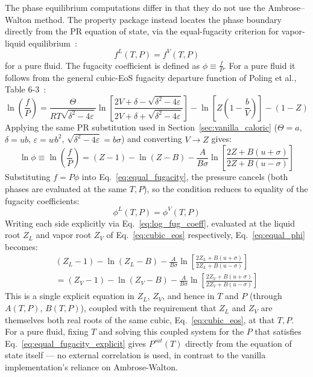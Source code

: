 \documentclass{article}
\begin{document}
The phase equilibrium computations differ in that they do not use the
Ambrose--Walton method. The property
package instead locates the phase boundary directly from the PR equation of state, via the equal-fugacity criterion for vapor-liquid
equilibrium~\cite[sec.\ 8-2]{poling2001}:
\begin{equation}\label{eq:equal_fugacity}
    f^{L}(T,P) = f^{V}(T,P)
\end{equation}
for a pure fluid. The fugacity coefficient is defined as $\phi\equiv \frac{f}{P}$. For a pure fluid it follows from the general cubic-EoS fugacity departure function of Poling et al., Table 6-3~\cite{poling2001}:
\begin{equation}
    \ln\left(\frac{f}{P}\right) = \frac{\Theta}{RT\sqrt{\delta^2-4\varepsilon}}\ln\left[\frac{2V+\delta-\sqrt{\delta^2-4\varepsilon}}{2V+\delta+\sqrt{\delta^2-4\varepsilon}}\right] - \ln\left[Z\left(1-\frac{b}{V}\right)\right] - (1-Z)
\end{equation}
Applying the same PR substitution used in Section~\ref{sec:vanilla_caloric} ($\Theta=a$,
$\delta=ub$, $\varepsilon=wb^2$, $\sqrt{\delta^2-4\varepsilon}=b\sigma$)
and converting $V\to Z$ gives:
\begin{equation}\label{eq:log_fug_coeff}
    \ln\phi \equiv \ln\left(\frac{f}{P}\right) = (Z-1) - \ln(Z-B) - \frac{A}{B\sigma}\ln\left[\frac{2Z+B(u+\sigma)}{2Z+B(u-\sigma)}\right]
\end{equation}
Substituting $f=P\phi$ into
Eq.~\eqref{eq:equal_fugacity}, the pressure cancels (both phases are
evaluated at the same $T,P$), so the condition reduces to equality of
the fugacity coefficients:
\begin{equation}\label{eq:equal_phi}
    \phi^{L}(T,P) = \phi^{V}(T,P)
\end{equation}
Writing each side explicitly via Eq.~\eqref{eq:log_fug_coeff}, evaluated
at the liquid root $Z_L$ and vapor root $Z_V$ of Eq.~\eqref{eq:cubic_eos}
respectively, Eq.~\eqref{eq:equal_phi} becomes:
\begin{equation}\label{eq:equal_fugacity_explicit}
\begin{aligned}
    (Z_L-1) - \ln(Z_L-B) - \frac{A}{B\sigma}\ln\left[\frac{2Z_L+B(u+\sigma)}{2Z_L+B(u-\sigma)}\right] \\
    = (Z_V-1) - \ln(Z_V-B) - \frac{A}{B\sigma}\ln\left[\frac{2Z_V+B(u+\sigma)}{2Z_V+B(u-\sigma)}\right]
\end{aligned}
\end{equation}
This is a single explicit equation in $Z_L$, $Z_V$, and hence in $T$ and
$P$ (through $A(T,P)$, $B(T,P)$), coupled with the requirement that
$Z_L$ and $Z_V$ are themselves both real roots of the same cubic,
Eq.~\eqref{eq:cubic_eos}, at that $T,P$. For a pure fluid, fixing $T$
and solving this coupled system for the $P$ that satisfies
Eq.~\eqref{eq:equal_fugacity_explicit} gives $P^{sat}(T)$ directly from
the equation of state itself --- no external correlation is used, in
contrast to the vanilla implementation's reliance on Ambrose-Walton.
\end{document}
